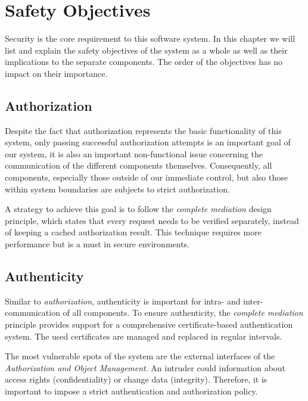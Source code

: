 \documentclass[12pt,a4paper,titlepage,oneside]{scrartcl}
\begin{document}
\maketitle
\setcounter{section}{0}
\setcounter{tocdepth}{2}
\tableofcontents

%
%

\section{Safety Objectives}
Security is the core requirement to this software system. In this chapter we will list and explain the safety objectives of the system as a whole as well as their implications to the separate components. The order of the objectives has no impact on their importance.

\subsection{Authorization}
Despite the fact that authorization represents the basic functionality of this system, only passing successful authorization attempts is an important goal of our system, it is also an important non-functional issue concerning the communication of the different components themselves. Consequently, all components, especially those outside of our immediate control, but also those within system boundaries are subjects to strict authorization.

A strategy to achieve this goal is to follow the \emph{complete mediation} design principle, which states that every request needs to be verified separately, instead of keeping a cached authorization result. This technique requires more performance but is a must in secure environments.

\subsection{Authenticity}
Similar to \emph{authorization}, authenticity is important for intra- and inter-communication of all components. To ensure authenticity, the \emph{complete mediation} principle provides support for a comprehensive certificate-based authentication system. The used certificates are managed and replaced in regular intervals.

The most vulnerable spots of the system are the external interfaces of the \emph{Authorization and Object Management}. An intruder could information about access rights (confidentiality) or change data (integrity). Therefore, it is important to impose a strict authentication and authorization policy.
\end{document}
